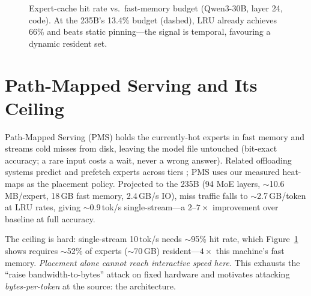 \documentclass[11pt]{article}
\newcommand{\tps}{tok/s}
\begin{document}
\begin{figure}[t]\centering
{}
\caption{Expert-cache hit rate vs.\ fast-memory budget (Qwen3-30B, layer 24,
code). At the 235B's 13.4\% budget (dashed), LRU already achieves 66\% and beats
static pinning---the signal is temporal, favouring a dynamic resident set.}
\label{fig:cache}
\end{figure}

\section{Path-Mapped Serving and Its Ceiling}
\label{sec:pms}
Path-Mapped Serving (PMS) holds the currently-hot experts in fast memory and
streams cold misses from disk, leaving the model file untouched (bit-exact
accuracy; a rare input costs a wait, never a wrong answer). Related offloading
systems predict and prefetch experts across tiers
\citep{xue2024powerinfer2,xue2024moeinfinity,tang2024hobbit,yi2023edgemoe,zhong2024adapmoe}; PMS uses our measured
heat-maps as the placement policy. Projected to the 235B (94 MoE layers,
$\sim$10.6\,MB/expert, 18\,GB fast memory, 2.4\,GB/s IO), miss traffic falls to
$\sim$2.7\,GB/token at LRU rates, giving $\sim$0.9\,\tps{}
single-stream---a $2$--$7\times$ improvement over baseline at full accuracy.

The ceiling is hard: single-stream 10\,\tps{} needs $\sim$95\% hit rate, which
Figure~\ref{fig:cache} shows requires $\sim$52\% of experts ($\sim$70\,GB)
resident---$4\times$ this machine's fast memory. \emph{Placement alone cannot
reach interactive speed here.} This exhausts the ``raise bandwidth-to-bytes''
attack on fixed hardware and motivates attacking \emph{bytes-per-token} at the
source: the architecture.
\end{document}
